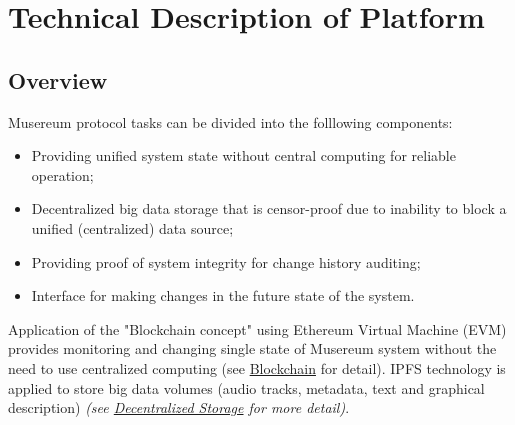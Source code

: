 \documentclass[12pt]{report}
\begin{document}
\chapter{Technical Description of Platform}
\section{Overview}
\label{tech-review}
\begin{multicols}{2}
Musereum protocol tasks can be divided into the folllowing components:
\begin{itemize}
\item Providing unified system state without central computing for reliable operation;
\item Decentralized big data storage that is censor-proof due to inability to block a unified (centralized) data source;
\item Providing proof of system integrity for change history auditing;
\item Interface for making changes in the future state of the system.
\end{itemize}
\vfill\null
\columnbreak
Application of the "Blockchain concept" using Ethereum Virtual Machine (EVM) provides monitoring and changing single state of Musereum system without the need to use centralized computing (see \hyperref[tech-blockchain]{Blockchain} for detail). IPFS technology is applied to store big data volumes (audio tracks, metadata, text and graphical description) \textit{(see \hyperref[tech-storage]{Decentralized Storage} for more detail)}.

\end{multicols}
\pagebreak
\end{document}
